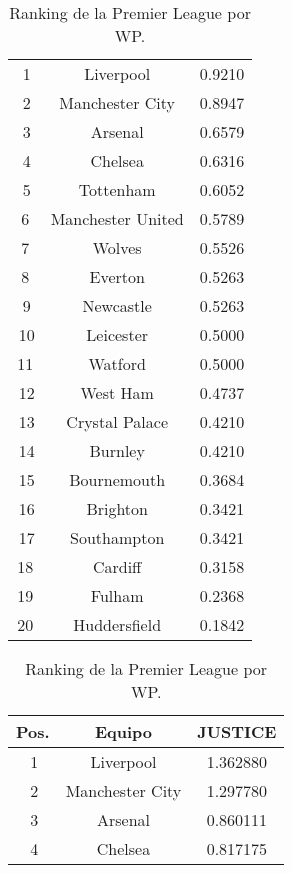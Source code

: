 \documentclass[a4paper]{article}
\newcommand{\bigfatgreen}{\begin{tikzpicture}[x=0.5pt,y=0.6pt,yscale=-.5,xscale=.5]
\draw  [fill=ForestGreen!70,fill opacity=1] (100,123.22) -- (113.25,113) -- (126.5,123.22) -- (119.88,123.22) -- (119.88,138.54) -- (106.63,138.54) -- (106.63,123.22) -- cycle ;
\end{tikzpicture}}
\newcommand{\bigfatred}{\begin{tikzpicture}[x=0.5pt,y=0.6pt,yscale=-.5,xscale=.5, rotate= 180]
\draw  [fill=red!70,fill opacity=1] (100,123.22) -- (113.25,113) -- (126.5,123.22) -- (119.88,123.22) -- (119.88,138.54) -- (106.63,138.54) -- (106.63,123.22) -- cycle ;
\end{tikzpicture}}
\begin{document}
\begin{table}[h]
{\begin{subtable}{0.4\textwidth}
\begin{tabular}{|c|c|c|}
        	\hline
            \bigfatgreen\,1 & Liverpool & 0.9210  \\
            \bigfatred\,2 & Manchester City & 0.8947  \\
            \bigfatgreen\,3 & Arsenal & 0.6579 \\
            \bigfatred\,4 & Chelsea  & 0.6316 \\
            \bigfatred\,5 & Tottenham & 0.6052\\
            6 & Manchester United  & 0.5789 \\
            7 & Wolves & 0.5526 \\
            8 & Everton & 0.5263 \\
            \bigfatgreen\,9 & Newcastle  & 0.5263 \\
            \bigfatred\,10 & Leicester  & 0.5000 \\
            11 & Watford & 0.5000 \\
            \bigfatred\,12 & West Ham  & 0.4737 \\
            \bigfatred\,13 & Crystal Palace  & 0.4210 \\
            \bigfatgreen\,14 & Burnley & 0.4210 \\
            \bigfatred\,15 & Bournemouth & 0.3684  \\
            \bigfatgreen\,16 & Brighton & 0.3421 \\
            \bigfatred\,17 & Southampton  & 0.3421 \\
            18 & Cardiff  & 0.3158 \\
            19 & Fulham & 0.2368 \\
            20 & Huddersfield & 0.1842 \\
            \hline
        \end{tabular}
        \caption{Ranking de la Premier League por WP.}
        \label{subtab:EFL_alg_wp}
    \end{subtable}%
    \begin{subtable}{0.4\textwidth}
        \centering
        \begin{tabular}{|c|c|c|}
            \hline
        	Pos. & Equipo & JUSTICE  \\
        	\hline
            \bigfatgreen\,1 & Liverpool & 1.362880  \\
            \bigfatred\,2 & Manchester City & 1.297780  \\
            \bigfatgreen\,3 & Arsenal & 0.860111 \\
            \bigfatred\,4 & Chelsea  & 0.817175 \\

\end{tabular}
\end{subtable}}
\end{table}
\end{document}
